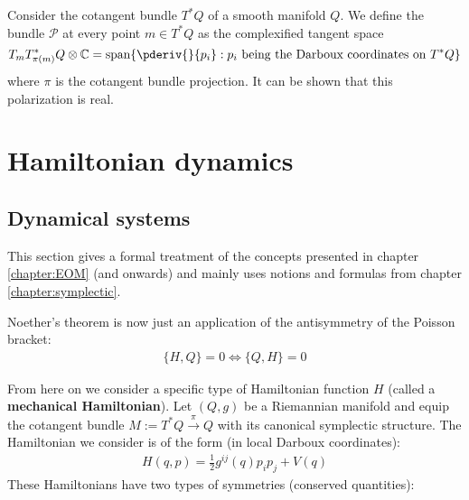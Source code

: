 	\begin{example}
		Consider the cotangent bundle $T^*Q$ of a smooth manifold $Q$. We define the bundle $\mathcal{P}$ at every point $m\in T^*Q$ as the complexified tangent space \[T_mT^*_{\pi(m)}Q\otimes\mathbb{C}=\text{span}\{\pderiv{}{p_i}:p_i\text{ being the Darboux coordinates on }T^*Q\}\] where $\pi$ is the cotangent bundle projection. It can be shown that this polarization is real.
	\end{example}

	
\section{Hamiltonian dynamics}
\subsection{Dynamical systems}

	This section gives a formal treatment of the concepts presented in chapter \ref{chapter:EOM} (and onwards) and mainly uses notions and formulas from chapter \ref{chapter:symplectic}.
	
	
	\begin{result}
		Noether's theorem is now just an application of the antisymmetry of the Poisson bracket:
		\begin{gather}
			\{H, Q\} = 0\iff\{Q, H\} = 0
		\end{gather}
	\end{result}
	
	From here on we consider a specific type of Hamiltonian function $H$ (called a \textbf{mechanical Hamiltonian}). Let $(Q, g)$ be a Riemannian manifold and equip the cotangent bundle $M:=T^*Q\overset{\pi}{\rightarrow}Q$ with its canonical symplectic structure. The Hamiltonian we consider is of the form (in local Darboux coordinates):
	\begin{gather}
		H(q, p) = \frac{1}{2}g^{ij}(q)p_ip_j + V(q)
	\end{gather}
	These Hamiltonians have two types of symmetries (conserved quantities):
	
